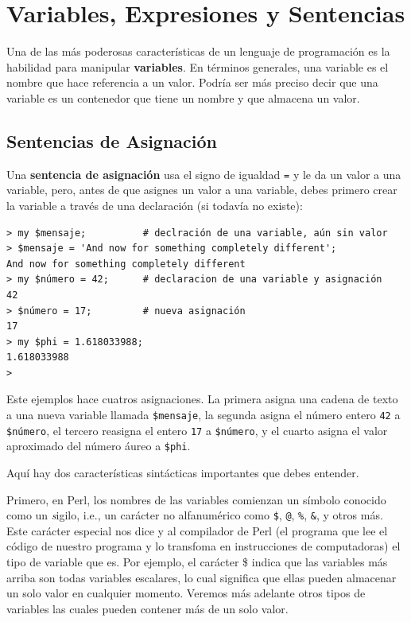 \chapter{Variables, Expresiones y Sentencias}

Una de las más poderosas características de un lenguaje de programación
es la habilidad para manipular {\bf variables}. En términos generales, 
una variable es el nombre que hace referencia a un valor. Podría ser 
más preciso decir que una variable es un contenedor  
que tiene un nombre y que almacena un valor.


\section{Sentencias de Asignación}
\label{variables}


Una {\bf sentencia de asignación} usa el signo de igualdad {\tt =}
y le da un valor a una variable, pero, antes de que asignes un valor 
a una variable, debes primero crear la variable a través de una
declaración (si todavía no existe):
\begin{lstlisting}
> my $mensaje;          # declración de una variable, aún sin valor
> $mensaje = 'And now for something completely different';
And now for something completely different
> my $número = 42;      # declaracion de una variable y asignación
42
> $número = 17;         # nueva asignación
17
> my $phi = 1.618033988;
1.618033988
>
\end{lstlisting}
%

Este ejemplos hace cuatros asignaciones. La primera asigna una cadena de texto
a una nueva variable llamada {\tt \$mensaje}, la segunda asigna 
el número entero {\tt 42} a {\tt \$número}, el tercero reasigna el entero {\tt 17} a
{\tt \$número}, y el cuarto asigna el valor aproximado del número áureo a {\tt \$phi}.

Aquí hay dos características sintácticas importantes que debes entender.

Primero, en Perl, los nombres de las variables comienzan un 
símbolo conocido como un {\emph sigilo}, i.e., un carácter no alfanumérico
como \verb'$', \verb'@', \verb'%', \verb'&', y otros más. Este carácter
especial nos dice y al compilador de Perl (el programa que lee
el código de nuestro programa y lo transfoma en instrucciones 
de computadoras) el tipo de variable que es. Por ejemplo, el 
carácter \$ indica que las variables más arriba son todas variables
escalares, lo cual significa que ellas pueden almacenar un solo valor
en cualquier momento. Veremos más adelante otros tipos de variables las
cuales pueden contener más de un solo valor.

